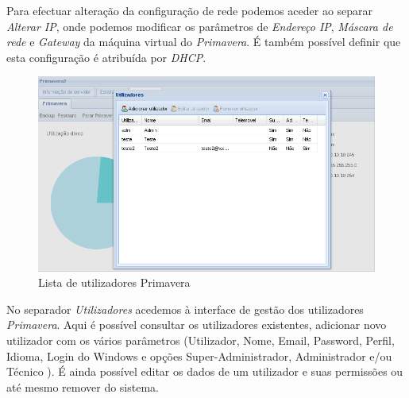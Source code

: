 Para efectuar alteração da configuração de rede podemos aceder ao separar \textit{Alterar IP}, onde podemos modificar os parâmetros de \textit{Endereço IP}, \textit{Máscara de rede} e \textit{Gateway} da máquina virtual do \textit{Primavera}. É também possível definir que esta configuração é atribuída por \textit{DHCP}.

\begin{figure}[H]
    \begin{center}
    \includegraphics[scale=0.38]{screenshots/primavera/primaverainterface_07.png}
    \caption{Lista de utilizadores Primavera}
    \label{fig:primavera_list_users}
    \end{center}
\end{figure}

No separador \textit{Utilizadores} acedemos à interface de gestão dos utilizadores \textit{Primavera}.
Aqui é possível consultar os utilizadores existentes, adicionar novo utilizador com os vários parâmetros (Utilizador, Nome, Email, Password, Perfil, Idioma, Login do Windows e opções Super-Administrador, Administrador e/ou Técnico ). É ainda possível editar os dados de um utilizador  e suas permissões ou até mesmo remover do sistema.


